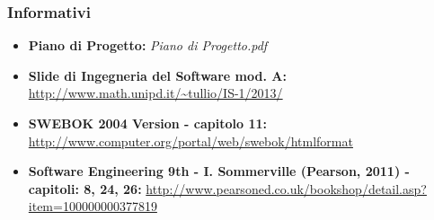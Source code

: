 	\subsubsection{Informativi}
		\begin{itemize}
  			\item \textbf{Piano di Progetto:} \emph{Piano di Progetto.pdf}
  			\item \textbf{Slide di Ingegneria del Software mod. A:} \url{http://www.math.unipd.it/~tullio/IS-1/2013/}
  			\item \textbf{SWEBOK 2004 Version - capitolo 11:} \url{http://www.computer.org/portal/web/swebok/htmlformat} 
  			\item \textbf{Software Engineering 9th - I. Sommerville (Pearson, 2011) - capitoli: 8, 24, 26:} \url{http://www.pearsoned.co.uk/bookshop/detail.asp?item=100000000377819}
		\end{itemize}
		

